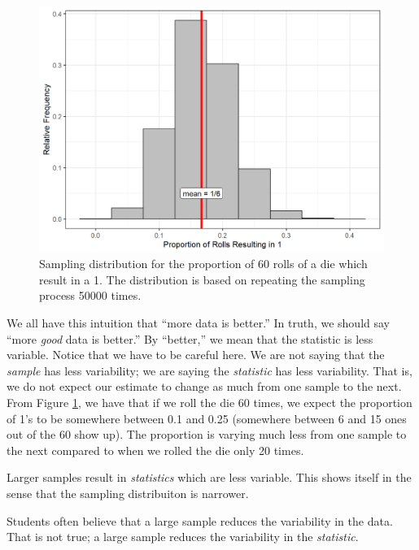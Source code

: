 \documentclass[
]{book}
\theoremstyle{plain}
\theoremstyle{mydefn}
\theoremstyle{myexmpl}
\theoremstyle{remark}
\begin{document}
\begin{figure}

{\centering \includegraphics[width=0.8\linewidth]{./Images/samplingdistns-dice-histogram2-1} 

}

\caption{Sampling distribution for the proportion of 60 rolls of a die which result in a 1.  The distribution is based on repeating the sampling process 50000 times.}\label{fig:samplingdistns-dice-histogram2}
\end{figure}

We all have this intuition that ``more data is better.'' In truth, we should say ``more \emph{good} data is better.'' By ``better,'' we mean that the statistic is less variable. Notice that we have to be careful here. We are not saying that the \emph{sample} has less variability; we are saying the \emph{statistic} has less variability. That is, we do not expect our estimate to change as much from one sample to the next. From Figure \ref{fig:samplingdistns-dice-histogram2}, we have that if we roll the die 60 times, we expect the proportion of 1's to be somewhere between 0.1 and 0.25 (somewhere between 6 and 15 ones out of the 60 show up). The proportion is varying much less from one sample to the next compared to when we rolled the die only 20 times.

\begin{rmdkeyidea}
Larger samples result in \emph{statistics} which are less variable. This shows itself in the sense that the sampling distribuiton is narrower.
\end{rmdkeyidea}

\begin{rmdtip}
Students often believe that a large sample reduces the variability in the data. That is not true; a large sample reduces the variability in the \emph{statistic}.
\end{rmdtip}
\end{document}
